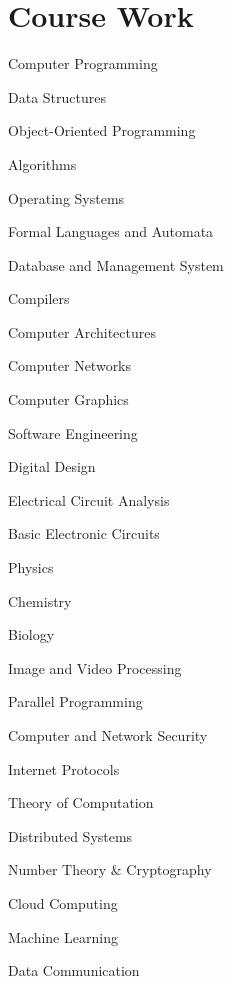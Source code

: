
\section{Course Work}
\begin{multicols}{3}
	\skiplocation
	\begin{tightemize}
		\item Computer Programming
		\item Data Structures
		\item Object-Oriented Programming
		\item Algorithms
		\item Operating Systems
		\item Formal Languages and Automata
		\item Database and Management System 
		\item Compilers
		\item Computer Architectures
		\item Computer Networks 
		\item Computer Graphics
		\item Software Engineering
		\item Digital Design
		\item Electrical Circuit Analysis
		\item Basic Electronic Circuits
		\item Physics
		\item Chemistry
		\item Biology
	\end{tightemize}
	
	\skiplocation
	\begin{tightemize}
		\item Image and Video Processing
		\item Parallel Programming
		\item Computer and Network Security
		\item Internet Protocols
		\item Theory of Computation
		\item Distributed Systems
		\item Number Theory \& Cryptography
		\item Cloud Computing
		\item Machine Learning
		\item Data Communication
	\end{tightemize}
	
	

\end{multicols}
